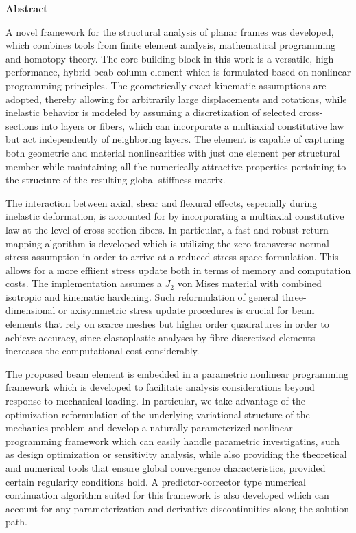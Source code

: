 \clearpage
\begin{center}
	\textbf{\Large Abstract}\\
	\vspace{\baselineskip}
\end{center}

A novel framework for the structural analysis of planar frames was developed, which 
combines tools from finite element analysis, mathematical programming and homotopy 
theory. The core building block in this work is a versatile, high-performance, hybrid 
beab-column element which is formulated based on nonlinear programming principles. The 
geometrically-exact kinematic assumptions are adopted, thereby allowing for 
arbitrarily large displacements and rotations, while inelastic behavior is modeled by
assuming a discretization of selected cross-sections into layers or fibers, which can 
incorporate a multiaxial constitutive law but act independently of neighboring layers. 
The element is capable of capturing both geometric and material nonlinearities with 
just one element per structural member while maintaining all the numerically 
attractive properties pertaining to the structure of the resulting global stiffness 
matrix.

The interaction between axial, shear and flexural effects, especially during inelastic 
deformation, is accounted for by incorporating a multiaxial constitutive law at the 
level of cross-section fibers. In particular, a fast and robust return-mapping 
algorithm is developed which is utilizing the zero transverse normal stress assumption 
in order to arrive at a reduced stress space formulation. This allows for a more 
effiient stress update both in terms of memory and computation costs. The 
implementation assumes a $J_2$ von Mises material with combined isotropic and 
kinematic hardening. Such reformulation of general three-dimensional or axisymmetric 
stress update procedures is crucial for beam elements that rely on scarce meshes but 
higher order quadratures in order to achieve accuracy, since elastoplastic analyses by 
fibre-discretized elements increases the computational cost considerably.

The proposed beam element is embedded in a parametric nonlinear programming framework 
which is developed to facilitate analysis considerations beyond response to mechanical 
loading. In particular, we take advantage of the optimization reformulation of the 
underlying variational structure of the mechanics problem and develop a naturally 
parameterized nonlinear programming framework which can easily handle parametric 
investigatins, such as design optimization or sensitivity analysis, while also 
providing the theoretical and numerical tools that ensure global convergence 
characteristics, provided certain regularity conditions hold. A predictor-corrector 
type numerical continuation algorithm suited for this framework is also developed 
which can account for any parameterization and derivative discontinuities along the 
solution path.  

